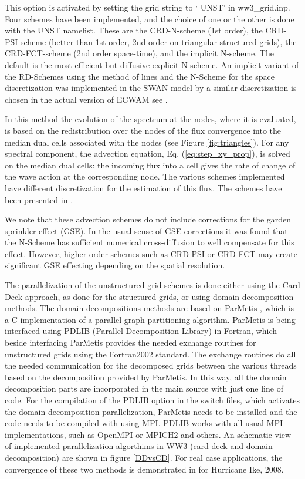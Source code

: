 This option is activated by setting the grid string to `{\code
UNST}' in {\file ww3\_grid.inp}.  Four schemes have been implemented, and the
choice of one or the other is done with the {\code UNST} namelist.  These are
the CRD-N-scheme (1st order), the CRD-PSI-scheme (better than 1st order, 2nd
order on triangular structured grids), the CRD-FCT-scheme (2nd order
space-time), and the implicit N-scheme. The default is the most efficient but
diffusive explicit N-scheme. An implicit variant of the RD-Schemes
using the method of lines and the N-Scheme for the space discretization was
implemented in the SWAN model by \cite{art:Zij10}  a similar discretization
is chosen in the actual version of ECWAM see \cite{pro:rol2012}.

In this method the evolution of the spectrum at the nodes, where it is
evaluated, is based on the redistribution over the nodes of the flux
convergence into the median dual cells associated with the nodes (see Figure
\ref{fig:triangles}).  For any spectral component, the advection equation, Eq.
(\ref{eq:step_xy_prop}), is solved on the median dual cells: the incoming flux
into a cell gives the rate of change of the wave action at the corresponding
node. The various schemes implemented have different discretization for the
estimation of this flux. The schemes have been presented in \citep[see][for a
review]{rep:Roland2008}.

We note that these advection schemes do not include corrections for
the garden sprinkler effect (GSE). In the usual sense of GSE corrections
it was found that the N-Scheme has sufficient numerical cross-diffusion
to well compensate for this effect. However, higher order schemes such
as CRD-PSI or CRD-FCT may create significant GSE effecting depending
on the spatial resolution.

The parallelization of the unstructured grid schemes is done either
using the Card Deck approach, as done for the structured grids, or using
domain decomposition methods. The domain decompositions methods are based
on ParMetis \citep{rep:karypis2011metis}, which is a C implementation of a parallel
graph partitioning algorithm. ParMetis is being interfaced using
PDLIB (Parallel Decomposition Library) in Fortran, which beside interfacing
ParMetis provides the needed exchange routines for unstructured
grids using the Fortran2002 standard. The exchange routines do
all the needed communication for the decomposed grids between the
various threads based on the decomposition provided by ParMetis.
In this way, all the domain decomposition parts are incorporated in
the main source with just one line of code. For the compilation of
the PDLIB option in the switch files, which activates the domain
decomposition parallelization, ParMetis needs to be installed
and the code needs to be compiled with using MPI. PDLIB works with
all usual MPI implementations, such as OpenMPI or MPICH2 and others. An schematic view of implemented parallelization algorthims in WW3 (card deck and domain decomposition) are shown in figure \ref{DDvsCD}. For real case applications, the convergence of these two methods is demonstrated in \cite{AbdolaliEtAl2019OM} for Hurricane Ike, 2008.


